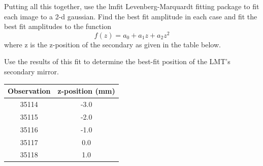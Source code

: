 
Putting all this together, use the lmfit Levenberg-Marquardt fitting package to fit each image to a 2-d gaussian. 
Find the best fit amplitude in each case and fit the best fit amplitudes to the function
\begin{equation}
    f(z)=a_0+a_1z+a_2z^2
\end{equation}
where z is the z-position of the secondary as given in the table below.

Use the results of this
fit to determine the best-fit position of the LMT's secondary mirror.

\begin{table}[h]
    \centering
    \begin{tabular}{|c|c|}
        \toprule
         Observation  & z-position (mm)  \\
         \midrule
         35114 & -3.0\\
         35115 & -2.0 \\
         35116 & -1.0 \\
         35117 & 0.0 \\
         35118 & 1.0\\
         \bottomrule
    \end{tabular}
\end{table}

